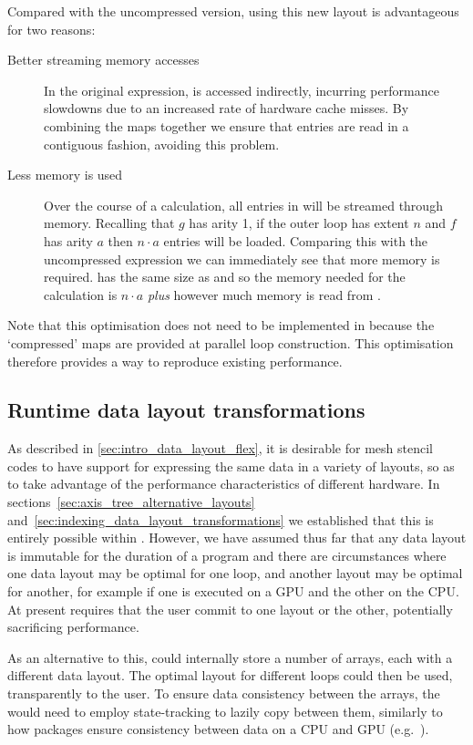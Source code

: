 \documentclass[thesis]{subfiles}
\begin{document}
Compared with the uncompressed version, using this new layout is advantageous for two reasons:
\begin{description}
  \item[Better streaming memory accesses]
    In the original expression,  is accessed indirectly, incurring performance slowdowns due to an increased rate of hardware cache misses.
    By combining the maps together we ensure that entries are read in a contiguous fashion, avoiding this problem.
  \item[Less memory is used]
    Over the course of a calculation, all entries in  will be streamed through memory.
    Recalling that $g$ has arity 1, if the outer loop has extent $n$ and $f$ has arity $a$ then $n\cdot a$ entries will be loaded.
    Comparing this with the uncompressed expression we can immediately see that more memory is required.
     has the same size as  and so the memory needed for the calculation is $n\cdot a$ \emph{plus} however much memory is read from .
\end{description}

Note that this optimisation does not need to be implemented in  because the `compressed' maps are provided at parallel loop construction.
This optimisation therefore provides a way to reproduce existing  performance.

\subsection{Runtime data layout transformations}

As described in \cref{sec:intro_data_layout_flex}, it is desirable for mesh stencil codes to have support for expressing the same data in a variety of layouts, so as to take advantage of the performance characteristics of different hardware.
In sections~\ref{sec:axis_tree_alternative_layouts} and~\ref{sec:indexing_data_layout_transformations} we established that this is entirely possible within .
However, we have assumed thus far that any data layout is immutable for the duration of a program and there are circumstances where one data layout may be optimal for one loop, and another layout may be optimal for another, for example if one is executed on a GPU and the other on the CPU.
At present  requires that the user commit to one layout or the other, potentially sacrificing performance.

As an alternative to this,   could internally store a number of arrays, each with a different data layout.
The optimal layout for different loops could then be used, transparently to the user.
To ensure data consistency between the arrays, the  would need to employ state-tracking to lazily copy between them, similarly to how packages ensure consistency between data on a CPU and GPU (e.g.~\cite{millsPerformancePortablePETScGPUbased2020}).
\end{document}
